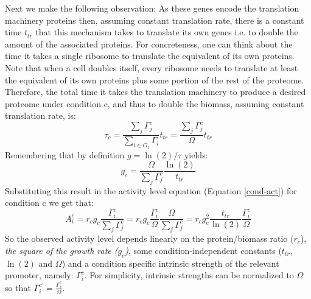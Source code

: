 \documentclass[a4page,notitlepage]{article}
\begin{document}
Next we make the following observation:
As these genes encode the translation machinery proteins then, assuming constant translation rate, there is a constant time $t_{tr}$ that this mechanism takes to translate its own genes i.e. to double the amount of the associated proteins.
For concreteness, one can think about the time it takes a single ribosome to translate the equivalent of its own proteins.
Note that when a cell doubles itself, every ribosome needs to translate at least the equivalent of its own proteins plus some portion of the rest of the proteome.
Therefore, the total time it takes the translation machinery to produce a desired proteome under condition c, and thus to double the biomass, assuming constant translation rate, is:
\[\tau_c=\frac{\sum_{j}\Gamma^c_j}{\sum_{i \in G_t}\Gamma_i}t_{tr}=\frac{\sum_{j}\Gamma^c_j}{\Omega}t_{tr}\]
Remembering that by  definition $g=\ln(2)/\tau$ yields:
\[g_c=\frac{\Omega}{\sum_{j}\Gamma^c_j}\frac{\ln(2)}{t_{tr}}\]
Substituting this result in the activity level equation (Equation \ref{cond-act}) for condition c we get that:
\begin{equation}
\label{ind-act}
A^c_i=r_c g_c \frac{\Gamma^c_i}{\sum_{j}\Gamma^c_j}=r_c g_c \frac{\Gamma^c_i}{\Omega}\frac{\Omega}{\sum_{j}\Gamma^c_j}=r_c g_c^2\frac{t_{tr}}{\ln(2)}\frac{\Gamma^c_i}{\Omega}
\end{equation}
So the observed activity level depends linearly on the protein/biomass ratio ($r_c$), \emph{the square of the growth rate ($g_c$)}, some condition-independent constants ($t_{tr}$, $\ln(2)$ and $\Omega$) and a condition specific intrinsic strength of the relevant promoter, namely: ${\Gamma^c_i}$.
For simplicity, intrinsic strengths can be normalized to $\Omega$ so that $\Gamma_i^{c'} = \frac{\Gamma^c_i}{\Omega}$.
\end{document}
